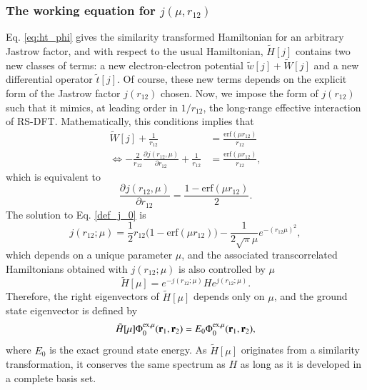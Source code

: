 \documentclass[aip,jcp,reprint,noshowkeys,superscriptaddress]{revtex4-1}
\newcommand{\deriv}[3]{\frac{\partial^{#3} #1}{\partial {#2}^{#3}}}
\newcommand{\br}[0]{{\bf {r}}}
\newcommand{\phimu}[0]{\Phi^{\text{ex},\mu}_0}
\begin{document}
\subsubsection{The working equation for $j(\mu,r_{12})$ }
Eq. \eqref{eq:ht_phi} gives the similarity transformed Hamiltonian for an arbitrary Jastrow factor, 
and with respect to the usual Hamiltonian, $\tilde{H}[j]$ contains two new classes of terms: 
a new electron-electron potential $\tilde{w}[j]+ \tilde{W}[j]$ and a new differential operator  $\tilde{t}[j]$. 
Of course, these new terms depends on the explicit form of the Jastrow factor $j(r_{12})$ chosen. 
Now, we impose the form of $j(r_{12})$ such that it mimics, at leading order in $1/r_{12}$, the long-range effective interaction of RS-DFT. 
Mathematically, this conditions implies that 
\begin{equation}
 \begin{aligned}
 \label{def_j_00}
 \tilde{W}[j] + \frac{1}{r_{12}}&= \frac{\text{erf}(\mu r_{12})}{r_{12}} \\ 
\Leftrightarrow -\frac{2}{r_{12}} \deriv{j(r_{12},\mu)}{r_{12}}{} + \frac{1}{r_{12}} & = \frac{\text{erf}(\mu r_{12})}{r_{12}}, 
 \end{aligned}
\end{equation}
which is equivalent to 
\begin{equation}
 \label{def_j_0}
 \deriv{j(r_{12},\mu)}{r_{12}}{} = \frac{1 - \text{erf}(\mu r_{12})}{2}.
\end{equation}
The solution to Eq. \eqref{def_j_0} is 
\begin{equation}
 \label{eq:def_j}
 j(r_{12};\mu) = \frac{1}{2}r_{12}\bigg( 1 - \text{erf}(\mu r_{12})  \bigg) - \frac{1}{2\sqrt{\pi}\mu}e^{-(r_{12}\mu)^2},
\end{equation}
which depends on a unique parameter $\mu$, 
and the associated transcorrelated Hamiltonians obtained with $j(r_{12};\mu)$ is also controlled by $\mu$
\begin{equation}
 \label{eq:def_ht_mu}
 \tilde{H}[\mu] = e^{-j(r_{12};\mu)} H e^{j(r_{12};\mu)}. 
\end{equation}
Therefore, the right eigenvectors of $\tilde{H}[\mu]$ depends only on $\mu$, and the ground state eigenvector is defined by 
\begin{equation}
 \tilde{H}[\mu] \phimu(\br{}_{1},\br{}_{2}) = E_0 \phimu(\br{}_{1},\br{}_{2}), 
\end{equation}
where $E_0$ is the exact ground state energy. 
As $\tilde{H}[\mu]$ originates from a similarity transformation, it conserves the same spectrum as $H$ as long as it is developed in a complete basis set. 
\end{document}
